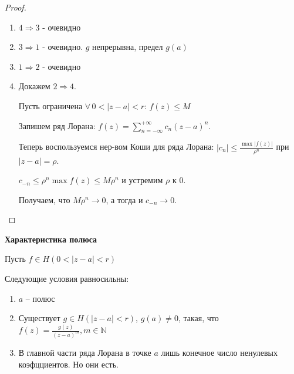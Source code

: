 \begin{proof}
    \begin{enumerate}
        
        \item $4 \Rightarrow 3$ - очевидно
        \item $3 \Rightarrow 1$ - очевидно. $g$ непрерывна, предел $g(a)$
        \item $1 \Rightarrow 2$ - очевидно
        \item {
            Докажем $2 \Rightarrow 4$.
            
            Пусть ограничена $\forall \, 0 < |z - a| < r$: $f(z) \leqslant M$
            
            Запишем ряд Лорана: $f(z) = \sum_{n = -\infty}^{+\infty} c_n(z - a)^n$.
            
            Теперь воспользуемся нер-вом Коши для ряда Лорана: $|c_n| \leqslant \frac{\max |f(z)|}{\rho^n}$ при $|z - a| = \rho$.


            $c_{-n} \leqslant \rho^n \max f(z) \leqslant M \rho^n$ и устремим $\rho$ к $0$.
            
            Получаем, что $M \rho^n \rightarrow 0$, а тогда и $c_{-n} \rightarrow 0$.
        }
    \end{enumerate}
\end{proof}

\begin{theorem}
    \textbf{Характеристика полюса}

    Пусть $f \in H(0 < |z - a| < r)$

    Следующие условия равносильны:

    \begin{enumerate}
        \item $a$ -- полюс
        \item Существует $g \in H(|z - a| < r)$, $g(a) \neq 0$, такая, что $f(z) = \frac{g(z)}{(z - a)^m}, m \in \mathbb{N}$
        \item В главной части ряда Лорана в точке $a$ лишь конечное число ненулевых коэфцциентов. Но они есть.
    \end{enumerate}
\end{theorem}


